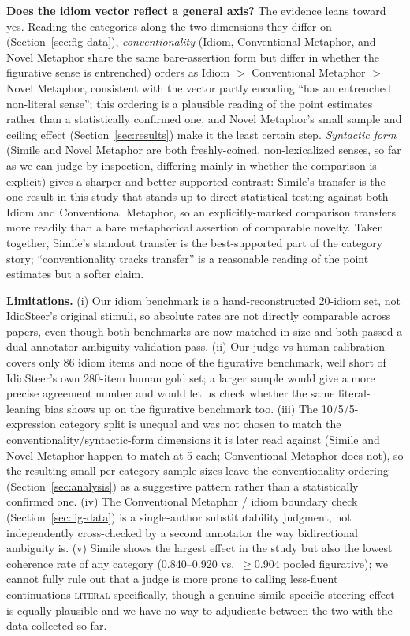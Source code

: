 \documentclass[11pt]{article}
\begin{document}
\textbf{Does the idiom vector reflect a general axis?} The evidence leans toward yes.
Reading the categories along the two dimensions they differ on
(Section~\ref{sec:fig-data}), \emph{conventionality} (Idiom, Conventional Metaphor, and
Novel Metaphor share the same bare-assertion form but differ in whether the figurative
sense is entrenched) orders as Idiom $>$ Conventional Metaphor $>$ Novel Metaphor,
consistent with the vector partly encoding ``has an entrenched non-literal sense''; this
ordering is a plausible reading of the point estimates rather than a statistically
confirmed one, and Novel Metaphor's small sample and ceiling effect
(Section~\ref{sec:results}) make it the least certain step. \emph{Syntactic form}
(Simile and Novel Metaphor are both freshly-coined, non-lexicalized senses, so far as we
can judge by inspection, differing mainly in whether the comparison is explicit) gives a
sharper and better-supported contrast: Simile's transfer is the one result in this study
that stands up to direct statistical testing against both Idiom and Conventional
Metaphor, so an explicitly-marked comparison transfers more readily than a bare
metaphorical assertion of comparable novelty. Taken together, Simile's standout transfer
is the best-supported part of the category story; ``conventionality tracks transfer'' is
a reasonable reading of the point estimates but a softer claim.

\textbf{Limitations.} (i) Our idiom benchmark is a hand-reconstructed 20-idiom set, not
IdioSteer's original stimuli, so absolute rates are not directly comparable across
papers, even though both benchmarks are now matched in size and both passed a
dual-annotator ambiguity-validation pass. (ii) Our judge-vs-human calibration covers only
86 idiom items and none of the figurative benchmark, well short of IdioSteer's own
280-item human gold set; a larger sample would give a more precise agreement number and
would let us check whether the same literal-leaning bias shows up on the figurative
benchmark too. (iii) The 10/5/5-expression category split is unequal and was not chosen
to match the conventionality/syntactic-form dimensions it is later read against (Simile
and Novel Metaphor happen to match at 5 each; Conventional Metaphor does not), so the
resulting small per-category sample sizes leave the conventionality ordering
(Section~\ref{sec:analysis}) as a suggestive pattern rather than a statistically
confirmed one. (iv) The Conventional Metaphor / idiom boundary check
(Section~\ref{sec:fig-data}) is a single-author substitutability judgment, not
independently cross-checked by a second annotator the way bidirectional ambiguity is.
(v) Simile shows the largest effect in the study but also the lowest coherence rate of
any category (0.840--0.920 vs.\ $\geq$0.904 pooled figurative); we cannot fully rule out
that a judge is more prone to calling less-fluent continuations \textsc{literal}
specifically, though a genuine simile-specific steering effect is equally plausible and
we have no way to adjudicate between the two with the data collected so far.
\end{document}
